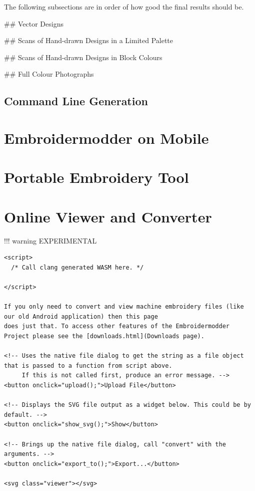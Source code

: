 The following subsections are in order of how good the final results should be.

## Vector Designs


## Scans of Hand-drawn Designs in a Limited Palette


## Scans of Hand-drawn Designs in Block Colours


## Full Colour Photographs



\subsection{Command Line Generation}


\section{Embroidermodder on Mobile}

\section{Portable Embroidery Tool}

\section{Online Viewer and Converter}

!!! warning
    EXPERIMENTAL

\begin{verbatim}
<script>
  /* Call clang generated WASM here. */
  
</script>

If you only need to convert and view machine embroidery files (like our old Android application) then this page
does just that. To access other features of the Embroidermodder Project please see the [downloads.html](Downloads page).

<!-- Uses the native file dialog to get the string as a file object that is passed to a function from script above.
     If this is not called first, produce an error message. -->
<button onclick="upload();">Upload File</button>

<!-- Displays the SVG file output as a widget below. This could be by default. -->
<button onclick="show_svg();">Show</button>

<!-- Brings up the native file dialog, call "convert" with the arguments. -->
<button onclick="export_to();">Export...</button>

<svg class="viewer"></svg>
\end{verbatim}

